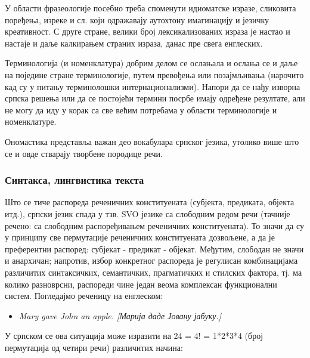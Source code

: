 \begin{multicols}{2}
У области фразеологије посебно треба споменути идиоматске изразе, сликовита поређења, изреке и сл. који одражавају аутохтону имагинацију и језичку креативност. С друге стране, велики број лексикализованих израза је настао и настаје и даље калкирањем  страних израза, данас пре свега енглеских.

Терминологија (и номенклатура) добрим делом се ослањала и ослања се и даље на поједине стране терминологије, путем превођења или позајмљивања (нарочито кад су у питању терминолошки интернационализми).  Напори да се нађу изворна српска решења или да се постојећи термини посрбе имају одређене резултате, али не могу да иду у корак са све већим потребама у области терминологије и номенклатуре.  

Ономастика представља важан део вокабулара српског језика, утолико више што се и овде стварају творбене породице речи.


\subsubsection {Синтакса, лингвистика текста}
  
Што се тиче распореда реченичних конституената (субјекта, предиката, објекта итд.), српски језик спада у тзв. SVO језике са слободним редом речи (тачније речено: са слободним распоређивањем реченичних конституената). То значи да су у принципу све пермутације реченичних конституената дозвољене, а да је преферентни распоред: субјекат - предикат - објекат. Међутим, слободан не значи и анархичан; напротив, избор конкретног распореда је регулисан комбинацијама различитих синтаксичких, семантичких, прагматичких и стилских фактора, тј. ма колико разноврсни, распореди чине један веома комплексан функционални систем. Погледајмо реченицу на енглеском: 
\begin{itemize}
\item \textit{Mary gave John an apple. [Марија даде Јовану јабуку.]} 
\end{itemize}
У српском се ова ситуација може изразити на 24 = 4! = 1*2*3*4 (број пермутација од четири речи) различитих начина:


\end{multicols}
